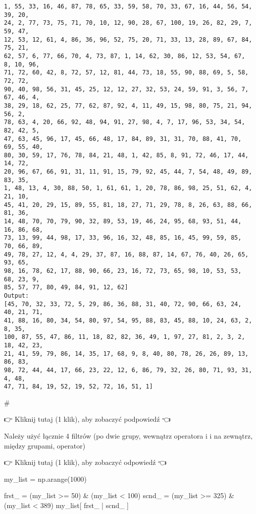 \documentclass[11pt]{article}
\newenvironment{Shaded}{}{}
\newcommand{\DecValTok}[1]{\textcolor[rgb]{0.25,0.63,0.44}{{#1}}}
\newcommand{\NormalTok}[1]{{#1}}
\newcommand{\OperatorTok}[1]{\textcolor[rgb]{0.40,0.40,0.40}{{#1}}}
\begin{document}
\begin{Verbatim}[commandchars=\\\{\}]
1, 55, 33, 16, 46, 87, 78, 65, 33, 59, 58, 70, 33, 67, 16, 44, 56, 54, 39, 20,
24, 2, 77, 73, 75, 71, 70, 10, 12, 90, 28, 67, 100, 19, 26, 82, 29, 7, 59, 47,
12, 53, 12, 61, 4, 86, 36, 96, 52, 75, 20, 71, 33, 13, 28, 89, 67, 84, 75, 21,
62, 57, 6, 77, 66, 70, 4, 73, 87, 1, 14, 62, 30, 86, 12, 53, 54, 67, 8, 10, 96,
71, 72, 60, 42, 8, 72, 57, 12, 81, 44, 73, 18, 55, 90, 88, 69, 5, 58, 72, 72,
90, 40, 98, 56, 31, 45, 25, 12, 12, 27, 32, 53, 24, 59, 91, 3, 56, 7, 67, 46, 4,
38, 29, 18, 62, 25, 77, 62, 87, 92, 4, 11, 49, 15, 98, 80, 75, 21, 94, 56, 2,
78, 63, 4, 20, 66, 92, 48, 94, 91, 27, 98, 4, 7, 17, 96, 53, 34, 54, 82, 42, 5,
47, 63, 45, 96, 17, 45, 66, 48, 17, 84, 89, 31, 31, 70, 88, 41, 70, 69, 55, 40,
80, 30, 59, 17, 76, 78, 84, 21, 48, 1, 42, 85, 8, 91, 72, 46, 17, 44, 14, 72,
20, 96, 67, 66, 91, 31, 11, 91, 15, 79, 92, 45, 44, 7, 54, 48, 49, 89, 83, 35,
1, 48, 13, 4, 30, 88, 50, 1, 61, 61, 1, 20, 78, 86, 98, 25, 51, 62, 4, 21, 10,
45, 41, 20, 29, 15, 89, 55, 81, 18, 27, 71, 29, 78, 8, 26, 63, 88, 66, 81, 36,
14, 48, 70, 70, 79, 90, 32, 89, 53, 19, 46, 24, 95, 68, 93, 51, 44, 16, 86, 68,
73, 13, 99, 44, 98, 17, 33, 96, 16, 32, 48, 85, 16, 45, 99, 59, 85, 70, 66, 89,
49, 78, 27, 12, 4, 4, 29, 37, 87, 16, 88, 87, 14, 67, 76, 40, 26, 65, 93, 65,
98, 16, 78, 62, 17, 88, 90, 66, 23, 16, 72, 73, 65, 98, 10, 53, 53, 68, 23, 9,
85, 57, 77, 80, 49, 84, 91, 12, 62]
Output:
[45, 70, 32, 33, 72, 5, 29, 86, 36, 88, 31, 40, 72, 90, 66, 63, 24, 40, 21, 71,
41, 88, 16, 80, 34, 54, 80, 97, 54, 95, 88, 83, 45, 88, 10, 24, 63, 2, 8, 35,
100, 87, 55, 47, 86, 11, 18, 82, 82, 36, 49, 1, 97, 27, 81, 2, 3, 2, 18, 42, 23,
21, 41, 59, 79, 86, 14, 35, 17, 68, 9, 8, 40, 80, 78, 26, 26, 89, 13, 86, 83,
98, 72, 44, 44, 17, 66, 23, 22, 12, 6, 86, 79, 32, 26, 80, 71, 93, 31, 4, 48,
47, 71, 84, 19, 52, 19, 52, 72, 16, 51, 1]
    \end{Verbatim}

    \#

👉 Kliknij tutaj (1 klik), aby zobaczyć podpowiedź 👈

Należy użyć łącznie 4 filtrów (po dwie grupy, wewnątrz operatora i i na
zewnątrz, między grupami, operator)

👉 Kliknij tutaj (1 klik), aby zobaczyć odpowiedź 👈

\begin{Shaded}
\begin{Highlighting}[]
\NormalTok{my\_list }\OperatorTok{=}\NormalTok{ np.arange(}\DecValTok{1000}\NormalTok{)}


\NormalTok{frst\_ }\OperatorTok{=}\NormalTok{ (my\_list }\OperatorTok{\textgreater{}=} \DecValTok{50}\NormalTok{) }\OperatorTok{\&}\NormalTok{ (my\_list }\OperatorTok{\textless{}} \DecValTok{100}\NormalTok{)}
\NormalTok{scnd\_ }\OperatorTok{=}\NormalTok{ (my\_list }\OperatorTok{\textgreater{}=} \DecValTok{325}\NormalTok{) }\OperatorTok{\&}\NormalTok{ (my\_list }\OperatorTok{\textless{}} \DecValTok{389}\NormalTok{)}
\NormalTok{my\_list[  frst\_ }\OperatorTok{|}\NormalTok{ scnd\_ ]}
\end{Highlighting}
\end{Shaded}
\end{document}
